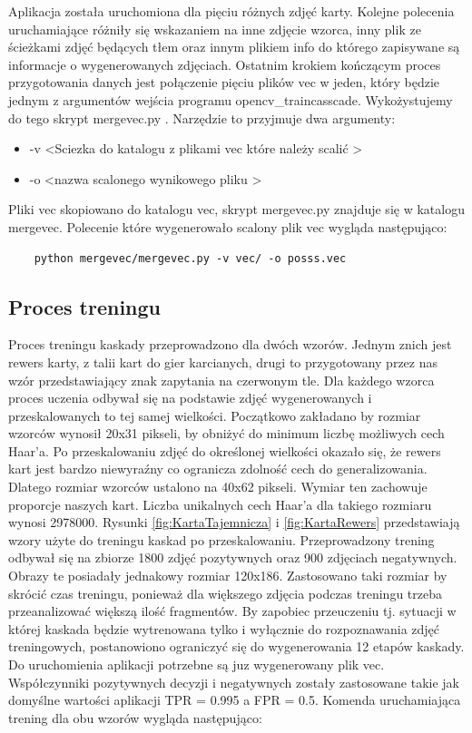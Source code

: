Aplikacja została uruchomiona dla pięciu różnych zdjęć karty. Kolejne polecenia uruchamiające różniły się wskazaniem na inne zdjęcie wzorca, inny plik ze ścieżkami zdjęć będących tłem oraz innym plikiem info do którego zapisywane są informacje o wygenerowanych zdjęciach.
Ostatnim krokiem kończącym proces przygotowania danych jest połączenie pięciu plików vec w jeden, który będzie jednym z argumentów wejścia programu opencv\_traincasscade. Wykożystujemy do tego skrypt mergevec.py \cite{mergeVec}. Narzędzie to przyjmuje dwa argumenty:
\begin{itemize}
    \item -v \textless Sciezka do katalogu z plikami vec które należy scalić \textgreater
    \item -o \textless nazwa scalonego wynikowego pliku \textgreater
\end{itemize}
Pliki vec skopiowano do katalogu vec, skrypt mergevec.py znajduje się w katalogu mergevec. Polecenie które wygenerowało scalony plik vec wygląda następująco: 
\begin{lstlisting}
    python mergevec/mergevec.py -v vec/ -o posss.vec
\end{lstlisting}
\subsection{Proces treningu}

Proces treningu kaskady przeprowadzono dla dwóch wzorów. Jednym znich jest rewers karty, z talii kart do gier karcianych, drugi to przygotowany przez nas wzór przedstawiający znak zapytania na czerwonym tle. Dla każdego wzorca proces uczenia odbywał się na podstawie zdjęć wygenerowanych i przeskalowanych to tej samej wielkości. Początkowo zakładano by rozmiar wzorców wynosił 20x31 pikseli, by obniżyć do minimum liczbę możliwych cech Haar'a.
Po przeskalowaniu zdjęć do określonej wielkości okazało się, że rewers kart jest bardzo niewyraźny co ogranicza zdolność cech do generalizowania. Dlatego rozmiar wzorców ustalono na 40x62 pikseli. Wymiar ten zachowuje proporcje naszych kart. Liczba unikalnych cech Haar'a dla takiego rozmiaru wynosi 2978000. Rysunki \ref{fig:KartaTajemnicza} i \ref{fig:KartaRewers} przedstawiają wzory użyte do treningu kaskad po przeskalowaniu. Przeprowadzony trening odbywał się na zbiorze 1800 zdjęć pozytywnych oraz 900 zdjęciach negatywnych. Obrazy te posiadały jednakowy rozmiar 120x186. Zastosowano taki rozmiar by skrócić czas treningu, ponieważ dla większego zdjęcia podczas treningu trzeba przeanalizować większą ilość fragmentów. By zapobiec przeuczeniu tj. sytuacji w której kaskada będzie wytrenowana tylko i wyłącznie do rozpoznawania zdjęć treningowych, postanowiono ograniczyć się do wygenerowania 12 etapów kaskady. Do uruchomienia aplikacji potrzebne są juz wygenerowany plik vec. Współczynniki pozytywnych decyzji i negatywnych zostały zastosowane takie jak domyślne wartości aplikacji TPR = 0.995 a FPR = 0.5. Komenda uruchamiająca trening dla obu wzorów wygląda następująco:

